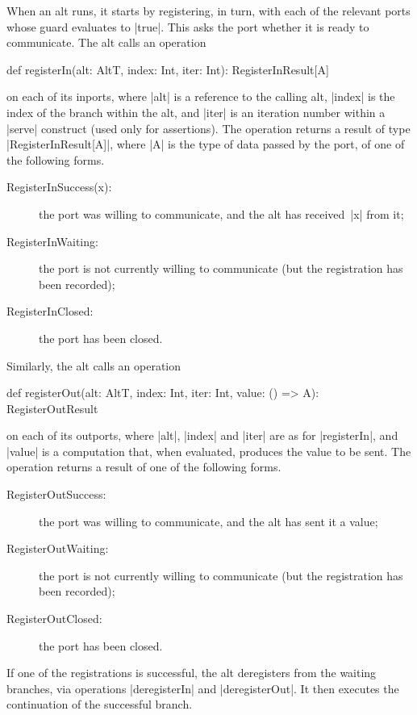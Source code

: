 When an alt runs, it starts by registering, in turn, with each of the relevant
ports whose guard evaluates to |true|.  This asks the port whether it is ready
to communicate.  The alt calls an operation
%
\begin{scala}
def registerIn(alt: AltT, index: Int, iter: Int): RegisterInResult[A]  
\end{scala}
%
on each of its inports, where |alt| is a reference to the calling alt, |index|
is the index of the branch within the alt, and |iter| is an iteration number
within a |serve| construct (used only for assertions).  The operation returns a
result of type |RegisterInResult[A]|, where |A| is the type of data passed by
the port, of one of the following forms.
%
\begin{description}
\item[\rm{\scalastyle RegisterInSuccess(x)}:] the port was willing to
  communicate, and the alt has received~|x| from it;

\item[\rm{\scalastyle RegisterInWaiting}:] the port is not currently willing to
  communicate (but the registration has been recorded); 

\item[\rm{\scalastyle RegisterInClosed}:] the port has been closed.
\end{description}
%
Similarly, the alt calls an operation
%
\begin{scala}
def registerOut(alt: AltT, index: Int, iter: Int, value: () => A): RegisterOutResult
\end{scala}
on each of its outports, where |alt|, |index| and |iter| are as for
|registerIn|, and |value| is a computation that, when evaluated, produces the
value to be sent.  The operation returns a result of one of the following
forms.
%
\begin{description}
\item[\rm{\scalastyle RegisterOutSuccess}:] the port was willing to
  communicate, and the alt has sent it a value;

\item[\rm{\scalastyle RegisterOutWaiting}:] the port is not currently willing to
  communicate (but the registration has been recorded); 

\item[\rm{\scalastyle RegisterOutClosed}:] the port has been closed.
\end{description}

If one of the registrations is successful, the alt deregisters from the
waiting branches, via operations |deregisterIn| and |deregisterOut|.  It then
executes the continuation of the successful branch.  

